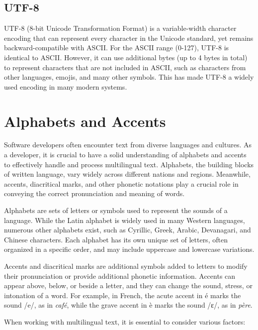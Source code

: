 \subsection{UTF-8}
UTF-8 (8-bit Unicode Transformation Format) is a variable-width
character encoding that can represent every character in the Unicode
standard, yet remains backward-compatible with ASCII. For the ASCII
range (0-127), UTF-8 is identical to ASCII. However, it can use additional
bytes (up to 4 bytes in total) to represent characters that are not
included in ASCII, such as characters from other languages, emojis,
and many other symbols. This has made UTF-8 a widely used encoding in
many modern systems.


\section{Alphabets and Accents}
Software developers often encounter
text from diverse languages and cultures. As a developer, it is
crucial to have a solid understanding of alphabets and accents to
effectively handle and process multilingual text. Alphabets, the
building blocks of written language, vary widely across different
nations and regions. Meanwhile, accents, diacritical marks, and other
phonetic notations play a crucial role in conveying the correct
pronunciation and meaning of words.  

Alphabets are sets of letters or symbols used to represent the sounds
of a language. While the Latin alphabet is widely used in many Western
languages, numerous other alphabets exist, such as Cyrillic, Greek,
Arabic, Devanagari, and Chinese characters. Each alphabet has its own
unique set of letters, often organized in a specific order, and may
include uppercase and lowercase variations.

Accents and diacritical marks are additional symbols added to letters
to modify their pronunciation or provide additional phonetic
information. Accents can appear above, below, or beside a letter, and
they can change the sound, stress, or intonation of a word. For example, in French, the acute accent in \'e marks the sound /e/, as in \emph{caf\'e}, while the grave accent in \`e marks the sound /ɛ/, as in \emph{p\`ere}.

When working with multilingual text, it is essential to consider
various factors:

